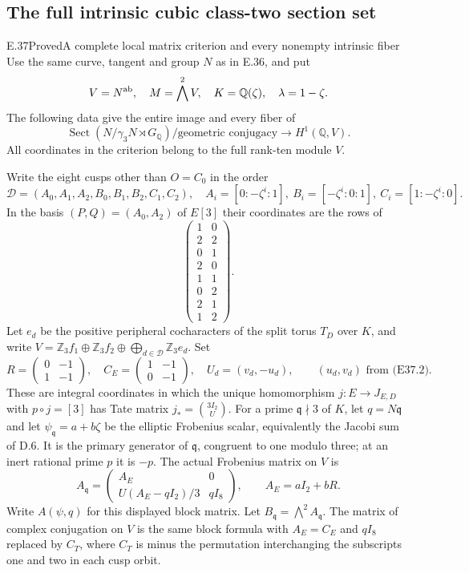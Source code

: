 \subsection{The full intrinsic cubic class-two section set}

\begin{statement}{E.37}{Proved}{A complete local matrix criterion and every nonempty intrinsic fiber}
Use the same curve, tangent and group $N$ as in E.36, and put
\[
 V=N^{\rm ab},\quad M=\bigwedge^2V,\quad
 K=\mathbb Q(\zeta),\quad \lambda=1-\zeta .
\]
The following data give the entire image and every fiber of
\[
 \operatorname{Sect}(N/\gamma_3N\rtimes G_{\mathbb Q})
          /\text{geometric conjugacy}
       \longrightarrow H^1(\mathbb Q,V).
 \tag{E37.1}
\]
All coordinates in the criterion belong to the full rank-ten
module $V$.

Write the eight cusps other than $O=C_0$ in the order
\[
 \mathcal D=(A_0,A_1,A_2,B_0,B_1,B_2,C_1,C_2),
 \quad A_i=[0:-\zeta^i:1],\ B_i=[-\zeta^i:0:1],\
 C_i=[1:-\zeta^i:0].
\]
In the basis $(P,Q)=(A_0,A_2)$ of $E[3]$ their coordinates
are the rows of
\[
 \begin{pmatrix}1&0\\2&2\\0&1\\2&0\\1&1\\0&2\\2&1\\1&2\end{pmatrix}.
 \tag{E37.2}
\]
Let $e_d$ be the positive peripheral cocharacters of the
split torus $T_D$ over $K$, and write
$V=\mathbb Z_3f_1\oplus\mathbb Z_3f_2\oplus
\bigoplus_{d\in\mathcal D}\mathbb Z_3e_d$.
Set
\[
 R=\begin{pmatrix}0&-1\\1&-1\end{pmatrix},\quad
 C_E=\begin{pmatrix}1&-1\\0&-1\end{pmatrix},\quad
 U_d=(v_d,-u_d),\qquad (u_d,v_d)\text{ from (E37.2)}.
 \tag{E37.3}
\]
These are integral coordinates in which the unique homomorphism
$j:E\to J_{E,D}$ with $p\circ j=[3]$ has Tate matrix
$j_*=\binom{3I_2}{U}$.
For a prime $\mathfrak q\nmid3$ of $K$, let $q=N\mathfrak q$
and let $\psi_{\mathfrak q}=a+b\zeta$ be the elliptic
Frobenius scalar, equivalently the Jacobi sum of D.6.
It is the primary generator of $\mathfrak q$, congruent to
one modulo three; at an inert rational prime $p$ it is $-p$.
The actual Frobenius matrix on $V$ is
\[
 A_{\mathfrak q}=
 \begin{pmatrix}
  A_E&0\\ U(A_E-qI_2)/3&qI_8
 \end{pmatrix},\qquad A_E=aI_2+bR .
 \tag{E37.4}
\]
Write $A(\psi,q)$ for this displayed block matrix.
Let $B_{\mathfrak q}=\bigwedge^2A_{\mathfrak q}$.
The matrix of complex conjugation on $V$ is the same block
formula with $A_E=C_E$ and $qI_8$ replaced by $C_T$, where
$C_T$ is minus the permutation interchanging the subscripts
one and two in each cusp orbit.


\end{statement}
